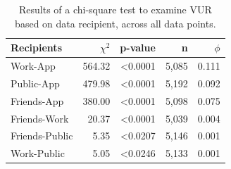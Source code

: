 \documentclass{acm_proc_article-sp}
\begin{document}

\begin{table}[t]
\begin{center}
\begin{tabular}{|l|r|r|r|r|}
\hline
Recipients	& $\chi^2$ & p-value 	& n & $\phi$ \\
\hline
Work-App	& 564.32 & <0.0001 & 5,085 & 0.111\\
Public-App	& 479.98 & <0.0001 & 5,192 & 0.092\\
Friends-App & 380.00 & <0.0001 & 5,098 & 0.075\\
Friends-Work & 20.37 & <0.0001 & 5,039 & 0.004\\
Friends-Public & 5.35 & <0.0207 & 5,146 & 0.001\\
Work-Public&  5.05 & <0.0246 & 5,133	& 0.001\\
\hline
\end{tabular}
\caption{Results of a chi-square test to examine VUR based on data recipient, across all data points.}
\label{recipient}
\end{center}
\end{table}

\end{document}
